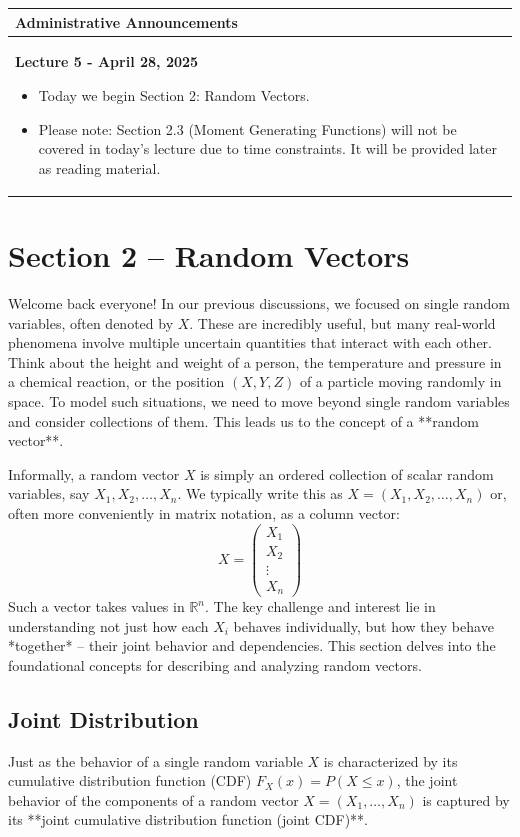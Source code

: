 \documentclass[11pt, a4paper]{article}
\theoremstyle{definition} %
\newenvironment{adminnote}{%
  \par\vspace{1ex}\noindent %
  \begin{center}
  \begin{tabular}{|p{0.9\textwidth}|}
  \hline
  \textbf{Administrative Announcements} \\
  \hline
  \vspace{0.5ex} %
}
{
  \vspace{0.5ex} %
  \\ \hline
  \end{tabular}
  \end{center}
  \par\vspace{1ex} %
}
\newcommand{\R}{\mathbb{R}}
\begin{document}
\begin{adminnote}
\textbf{Lecture 5 - April 28, 2025}
\begin{itemize}
    \item Today we begin Section 2: Random Vectors.
    \item Please note: Section 2.3 (Moment Generating Functions) will not be covered in today's lecture due to time constraints. It will be provided later as reading material.
\end{itemize}
\end{adminnote}

\section{Section 2 – Random Vectors}

Welcome back everyone! In our previous discussions, we focused on single random variables, often denoted by $X$. These are incredibly useful, but many real-world phenomena involve multiple uncertain quantities that interact with each other. Think about the height and weight of a person, the temperature and pressure in a chemical reaction, or the position $(X, Y, Z)$ of a particle moving randomly in space. To model such situations, we need to move beyond single random variables and consider collections of them. This leads us to the concept of a **random vector**.

Informally, a random vector $X$ is simply an ordered collection of scalar random variables, say $X_1, X_2, \dots, X_n$. We typically write this as $X = (X_1, X_2, \dots, X_n)$ or, often more conveniently in matrix notation, as a column vector:
\[ X = \begin{pmatrix} X_1 \\ X_2 \\ \vdots \\ X_n \end{pmatrix} \]
Such a vector takes values in $\R^n$. The key challenge and interest lie in understanding not just how each $X_i$ behaves individually, but how they behave *together* – their joint behavior and dependencies. This section delves into the foundational concepts for describing and analyzing random vectors.

\subsection{Joint Distribution}

Just as the behavior of a single random variable $X$ is characterized by its cumulative distribution function (CDF) $F_X(x) = P(X \le x)$, the joint behavior of the components of a random vector $X = (X_1, \dots, X_n)$ is captured by its **joint cumulative distribution function (joint CDF)**.
\end{document}
